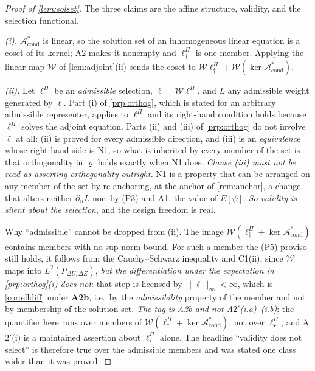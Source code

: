 \begin{proof}[Proof of \cref{lem:solset}]
The three claims are the affine structure, validity, and the selection functional.

\emph{(i).} $\mathcal A^\ast_{\mathrm{cond}}$ is linear, so the solution set of an inhomogeneous linear
equation is a coset of its kernel; A2 makes it nonempty and $\ell^\Pi_\dagger$ is one member. Applying
the linear map $\mathcal W$ of \cref{lem:adjoint}(ii) sends the coset to
$\mathcal W\ell^\Pi_\dagger+\mathcal W(\ker\mathcal A^\ast_{\mathrm{cond}})$.

\emph{(ii).} Let $\ell^\Pi$ be an \emph{admissible} selection, $\ell=\mathcal W\ell^\Pi$, and $L$ any
admissible weight generated by $\ell$. Part (i) of \cref{prp:orthog}, which is stated for an arbitrary
admissible representer, applies to $\ell^\Pi$ and its right-hand condition holds because $\ell^\Pi$
solves the adjoint equation. Parts (ii) and (iii) of
\cref{prp:orthog} do not involve $\ell$ at all: (ii) is proved for every admissible direction, and (iii)
is an \emph{equivalence} whose right-hand side is N1, so what is inherited by every member of the set
is that orthogonality in $\varrho$ holds exactly when N1 does. \emph{Clause (iii) must not be read as
asserting orthogonality outright.} N1 is a property that can be arranged
on any member of the set by re-anchoring, at the anchor of \cref{rem:anchor}, a change that alters
neither $\partial_uL$ nor, by (P3) and A1, the
value of $E[\psi]$. \emph{So validity is silent about the selection}, and the design freedom is real.

Why ``admissible'' cannot be dropped from \textup{(ii)}. The
image $\mathcal W(\ell^\Pi_\dagger+\ker\mathcal A^\ast_{\mathrm{cond}})$ contains members with no
sup-norm bound. For such a member the (P5) proviso still holds, it follows from the Cauchy--Schwarz
inequality and C1(ii), since $\mathcal W$ maps into $L^{2}(P_{\Delta U,\Delta Z})$, \emph{but the
differentiation under the expectation in \cref{prp:orthog}(i) does not}: that step is licensed by
$\|\ell\|_\infty<\infty$, which is \cref{cor:elldiff} under \textbf{A2b}, i.e.\ by the
\emph{admissibility} property of the member and not by membership of the solution set. \emph{The tag is
A2b and not A$2'$(i.a)--(i.b)}: the quantifier here runs over members of
$\mathcal W(\ell^\Pi_\dagger+\ker\mathcal A^\ast_{\mathrm{cond}})$, not over $\ell^\Pi_\star$, and
A$2'$(i) is a maintained assertion about $\ell^\Pi_\star$ alone. The headline ``validity does not
select'' is therefore true over the admissible members and was stated one class wider than it was proved.


\end{proof}
